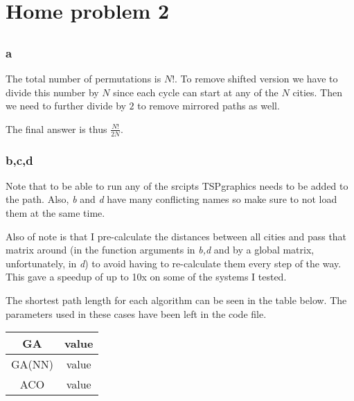 \documentclass{article}
\begin{document}
\section*{Home problem 2}

\setcounter{section}{2}
\subsection{}
\subsubsection*{a}

The total number of permutations is $N!$. To remove shifted version we have to
divide this number by $N$ since each cycle can start at any of the $N$ cities.
Then we need to further divide by $2$ to remove mirrored paths as well.

The final answer is thus $\frac{N!}{2N}$.

\subsubsection*{b,c,d}

Note that to be able to run any of the srcipts TSPgraphics needs to be added to
the path. Also, \emph{b} and \emph{d} have many conflicting names so make sure
to not load them at the same time.

Also of note is that I pre-calculate the distances between all cities and pass
that matrix around (in the function arguments in \emph{b,d} and by a global
matrix, unfortunately, in \emph{d}) to avoid having to re-calculate them every
step of the way.  This gave a speedup of up to 10x on some of the systems I
tested.

The shortest path length for each algorithm can be seen in the table below. The
parameters used in these cases have been left in the code file.

\begin{center}
  \begin{tabular}{| c | c |}
    \hline
    GA & value \\
    \hline
    GA(NN) & value \\
    \hline
    ACO & value\\
    \hline
  \end{tabular}
\end{center}

\subsection{}
\end{document}
